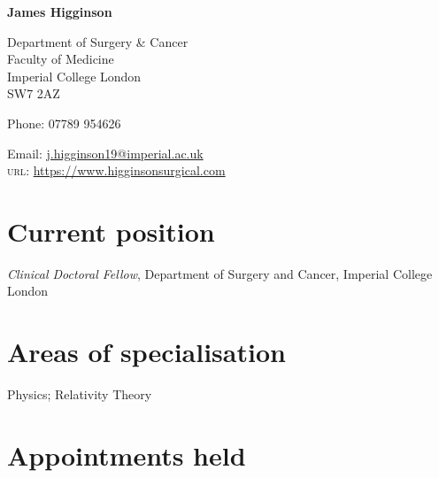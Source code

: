 \documentclass[12pt]{article} %
\begin{document}

{\LARGE\bfseries James Higginson} %
\bigskip\bigskip\medskip %

Department of Surgery \& Cancer\\
Faculty of Medicine\\ %
Imperial College London\\
SW7 2AZ

\medskip %

Phone: 07789 954626\\ %
\medskip %

Email: \href{mailto:j.higginson19@imperial.ac.uk}{j.higginson19@imperial.ac.uk}\\ %
\textsc{url}: \href{https://www.higginsonsurgical.com}{https://www.higginsonsurgical.com}\\ %

\vspace{0.06\textheight} %


\section*{Current position}

\emph{Clinical Doctoral Fellow}, Department of Surgery and Cancer, Imperial College London%


\section*{Areas of specialisation}

Physics; Relativity Theory %


\section*{Appointments held}
\end{document}
